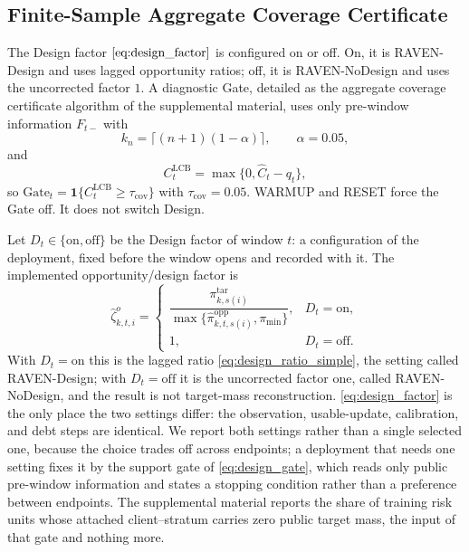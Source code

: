\documentclass[letterpaper,journal]{IEEEtran}
\begin{document}
\subsection{Finite-Sample Aggregate Coverage Certificate}
\label{subsec:agg_certificate_alg}

The Design factor $\eqref{eq:design_factor}$ is configured on or off.  On, it
is RAVEN-Design and uses lagged opportunity ratios; off, it is RAVEN-NoDesign
and uses the uncorrected factor $1$.  A diagnostic Gate, detailed as the
aggregate coverage certificate algorithm of the supplemental material, uses only
pre-window information $F_{t-}$ with
\begin{equation}
 k_n=\lceil(n+1)(1-\alpha)\rceil,
 \qquad
 \alpha=0.05,
 \label{eq:agg_kn}
\end{equation}
and
\begin{equation}
 C^{\mathrm{LCB}}_t=\max\{0,\widehat C_t-q_t\},
 \label{eq:agg_CLCB}
\end{equation}
so $\mathrm{Gate}_t=\mathbf{1}\{C^{\mathrm{LCB}}_t\ge\tau_{\mathrm{cov}}\}$ with
$\tau_{\mathrm{cov}}=0.05$.  WARMUP and RESET force the Gate off.  It does
not switch Design.

Let $D_t\in\{\mathrm{on},\mathrm{off}\}$ be the Design factor of window $t$:
a configuration of the deployment, fixed before the window opens and recorded
with it.  The implemented opportunity/design factor is
\begin{equation}
\widehat\zeta^{o}_{k,t,i}
=
\begin{cases}
\dfrac{\pi^{\mathrm{tar}}_{k,s(i)}}
{\max\{\widehat\pi^{\mathrm{opp}}_{k,t,s(i)},\pi_{\min}\}}, & D_t=\mathrm{on},\\[1.5mm]
1, & D_t=\mathrm{off}.
\end{cases}
\label{eq:design_factor}
\end{equation}
With $D_t=\mathrm{on}$ this is the lagged ratio
\eqref{eq:design_ratio_simple}, the setting called RAVEN-Design; with
$D_t=\mathrm{off}$ it is the uncorrected factor one, called RAVEN-NoDesign,
and the result is not target-mass reconstruction.
\eqref{eq:design_factor} is the only place the two settings differ: the
observation, usable-update, calibration, and debt steps are identical.
We report both settings rather than a single selected one, because the choice
trades off across endpoints; a deployment that needs one setting fixes it by the
support gate of \eqref{eq:design_gate}, which reads only public pre-window
information and states a stopping condition rather than a preference between
endpoints.  The supplemental material reports the share of training risk units
whose attached client--stratum carries zero public target mass, the input of that
gate and nothing more.
\end{document}
